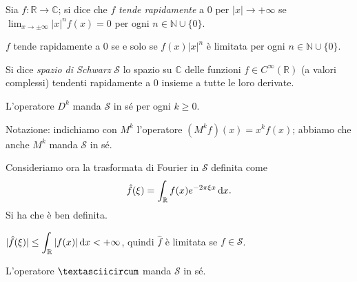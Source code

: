 \begin{defn}
  Sia $f:\mathbb{R} \longrightarrow \mathbb{C}$; si dice che $f$ \textit{tende rapidamente} a $0$ per $|x| \longrightarrow +\infty$ se $\displaystyle \lim_{x \longrightarrow \pm \infty} |x|^nf(x)=0$ per ogni $n \in \mathbb{N}\cup\{0\}$.
\end{defn}

\begin{oss} \label{rapsse}
  $f$ tende rapidamente a $0$ se e solo se $f(x)|x|^n$ è limitata per ogni $n \in \mathbb{N}\cup\{0\}$.
\end{oss}

\begin{defn}
  Si dice \textit{spazio di Schwarz} $\mathcal{S}$ lo spazio su $\mathbb{C}$ delle funzioni $f \in C^{\infty}(\mathbb{R})$ (a valori complessi) tendenti rapidamente a $0$ insieme a tutte le loro derivate.
\end{defn}

\begin{oss}
  L'operatore $D^k$ manda $\mathcal{S}$ in sé per ogni $k \ge 0$.
\end{oss}

Notazione: indichiamo con $M^k$ l'operatore $(M^kf)(x)=x^kf(x)$; abbiamo che anche $M^k$ manda $\mathcal{S}$ in sé.

Consideriamo ora la trasformata di Fourier in $\mathcal{S}$ definita come
$$\hat{f}(\xi)=\int_{\mathbb{R}} f(x)e^{-2\pi\xi x}\mathop{}\!\mathrm{d} x.$$
Si ha che è ben definita.

\begin{oss} \label{limFourier}
  $\displaystyle |\hat{f}(\xi)| \le \int_{\mathbb{R}} |f(x)|\mathop{}\!\mathrm{d} x<+\infty$, quindi $\hat{f}$ è limitata se $f \in \mathcal{S}$.
\end{oss}

\begin{lm}
  L'operatore $\textasciicircum$ manda $\mathcal{S}$ in sé.
\end{lm}

